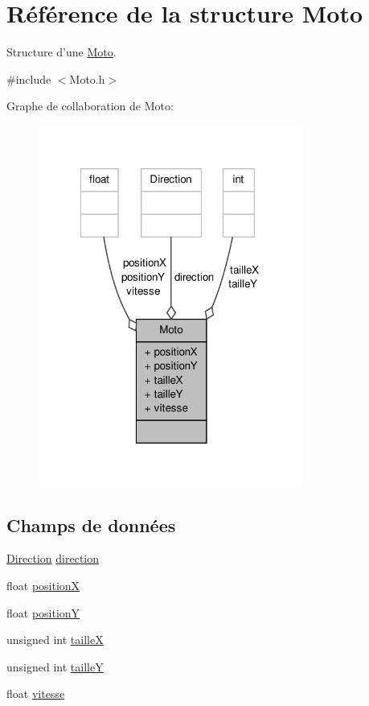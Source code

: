 \hypertarget{structMoto}{\section{Référence de la structure Moto}
\label{structMoto}
}


Structure d'une \hyperlink{structMoto}{Moto}.  




{\ttfamily \#include $<$Moto.\-h$>$}



Graphe de collaboration de Moto\-:\nopagebreak
\begin{figure}[H]
\begin{center}
\leavevmode
\includegraphics[width=247pt]{structMoto__coll__graph}
\end{center}
\end{figure}
\subsection*{Champs de données}
\begin{DoxyCompactItemize}
\item 
\hyperlink{Moto_8h_a224b9163917ac32fc95a60d8c1eec3aa}{Direction} \hyperlink{structMoto_ace42f991dc2d223029ca7f7162a10e9b}{direction}
\item 
float \hyperlink{structMoto_a7d9695eb69a7161d1a6800e4b8bc4170}{position\-X}
\item 
float \hyperlink{structMoto_a68859bbff76786aedccab8093a9de5a8}{position\-Y}
\item 
unsigned int \hyperlink{structMoto_a15d1b56209aba6ea0bc8eeaac82ae625}{taille\-X}
\item 
unsigned int \hyperlink{structMoto_ab7b358839b7d20f16a4a17e5eabad5a4}{taille\-Y}
\item 
float \hyperlink{structMoto_a561dfc3e54a534dfa92ccecbea8dbe71}{vitesse}
\end{DoxyCompactItemize}


